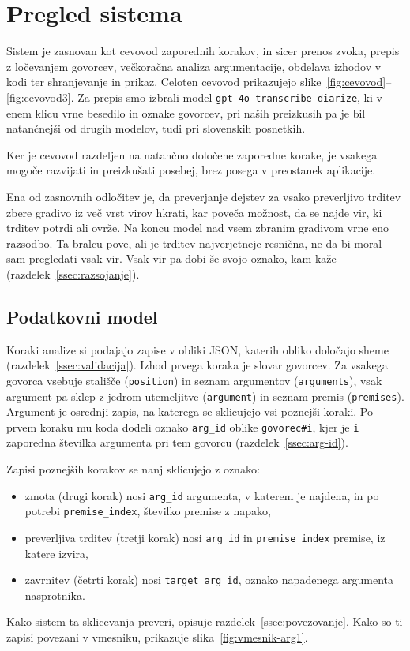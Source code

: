 \documentclass[a4paper, 12pt]{book}
\begin{document}
\section{Pregled sistema}
\label{sec:cevovod}

Sistem je zasnovan kot cevovod zaporednih korakov, in sicer prenos zvoka, prepis z ločevanjem govorcev, večkoračna analiza argumentacije, obdelava izhodov v kodi ter shranjevanje in prikaz. Celoten cevovod prikazujejo slike~\ref{fig:cevovod}--\ref{fig:cevovod3}. Za prepis smo izbrali model \texttt{gpt-4o-transcribe-diarize}, ki v enem klicu vrne besedilo in oznake govorcev, pri naših preizkusih pa je bil natančnejši od drugih modelov, tudi pri slovenskih posnetkih.

Ker je cevovod razdeljen na natančno določene zaporedne korake, je vsakega mogoče razvijati in preizkušati posebej, brez posega v preostanek aplikacije.

Ena od zasnovnih odločitev je, da preverjanje dejstev za vsako preverljivo
trditev zbere gradivo iz več vrst virov hkrati, kar poveča možnost, da se najde vir, ki trditev potrdi ali ovrže. Na koncu model nad vsem zbranim gradivom vrne eno razsodbo. Ta bralcu pove, ali je trditev najverjetneje resnična, ne da bi moral sam pregledati vsak vir. Vsak vir pa dobi še svojo oznako, kam kaže (razdelek~\ref{ssec:razsojanje}).

\subsection{Podatkovni model}
\label{sec:podatkovni-model}

Koraki analize si podajajo zapise v obliki JSON, katerih obliko določajo sheme (razdelek~\ref{ssec:validacija}). Izhod prvega koraka je slovar govorcev. Za vsakega govorca vsebuje stališče (\texttt{position}) in seznam argumentov (\texttt{arguments}), vsak argument pa sklep z jedrom utemeljitve (\texttt{argument}) in seznam premis (\texttt{premises}). Argument je osrednji zapis, na katerega se sklicujejo vsi poznejši koraki. Po prvem koraku mu koda dodeli oznako \texttt{arg\_id} oblike \texttt{govorec\#i}, kjer je \texttt{i} zaporedna številka argumenta pri tem govorcu (razdelek~\ref{ssec:arg-id}).

Zapisi poznejših korakov se nanj sklicujejo z oznako:
\begin{itemize}
\item zmota (drugi korak) nosi \texttt{arg\_id} argumenta, v katerem je najdena, in po potrebi \texttt{premise\_index}, številko premise z napako,
\item preverljiva trditev (tretji korak) nosi \texttt{arg\_id} in \texttt{premise\_index} premise, iz katere izvira,
\item zavrnitev (četrti korak) nosi \texttt{target\_arg\_id}, oznako napadenega argumenta nasprotnika.
\end{itemize}
Kako sistem ta sklicevanja preveri, opisuje razdelek~\ref{ssec:povezovanje}. Kako so ti zapisi povezani v vmesniku, prikazuje slika~\ref{fig:vmesnik-arg1}.
\end{document}
